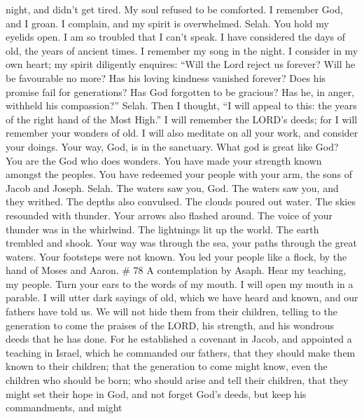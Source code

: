 night, and didn't get tired. My soul refused to be comforted.
 I remember God, and I groan. I complain, and my spirit is
overwhelmed. Selah.  You hold my eyelids open. I am so
troubled that I can't speak.  I have considered the days of
old, the years of ancient times.  I remember my song in the
night. I consider in my own heart; my spirit diligently enquires:
 ``Will the Lord reject us forever? Will he be favourable no
more?  Has his loving kindness vanished forever? Does his
promise fail for generations?  Has God forgotten to be
gracious? Has he, in anger, withheld his compassion?'' Selah.
 Then I thought, ``I will appeal to this: the years of the
right hand of the Most High.''  I will remember the LORD's
deeds; for I will remember your wonders of old.  I will
also meditate on all your work, and consider your doings. 
Your way, God, is in the sanctuary. What god is great like God?
 You are the God who does wonders. You have made your
strength known amongst the peoples.  You have redeemed your
people with your arm, the sons of Jacob and Joseph. Selah. 
The waters saw you, God. The waters saw you, and they writhed. The
depths also convulsed.  The clouds poured out water. The
skies resounded with thunder. Your arrows also flashed around.
 The voice of your thunder was in the whirlwind. The
lightnings lit up the world. The earth trembled and shook. 
Your way was through the sea, your paths through the great waters. Your
footsteps were not known.  You led your people like a
flock, by the hand of Moses and Aaron. \# 78 A contemplation by Asaph.
 Hear my teaching, my people. Turn your ears to the words of
my mouth.  I will open my mouth in a parable. I will utter
dark sayings of old,  which we have heard and known, and our
fathers have told us.  We will not hide them from their
children, telling to the generation to come the praises of the LORD, his
strength, and his wondrous deeds that he has done.  For he
established a covenant in Jacob, and appointed a teaching in Israel,
which he commanded our fathers, that they should make them known to
their children;  that the generation to come might know,
even the children who should be born; who should arise and tell their
children,  that they might set their hope in God, and not
forget God's deeds, but keep his commandments,  and might
